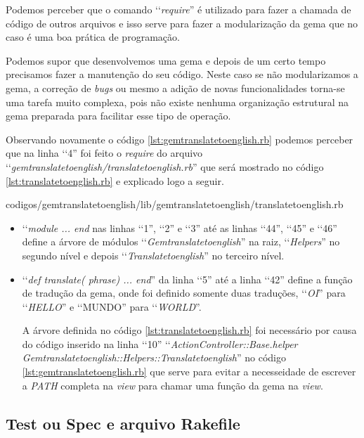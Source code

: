 Podemos perceber que o comando ‘‘\emph{require}'' é utilizado para fazer a chamada de código de outros 
arquivos e isso serve para fazer a modularização da gema que no caso é uma boa prática de programação.

Podemos supor que desenvolvemos uma gema e depois de um certo tempo precisamos fazer a manutenção do 
seu código. Neste caso se não modularizamos a gema, a correção de \emph{bugs} ou mesmo a adição de 
novas funcionalidades torna-se uma tarefa muito complexa, pois não existe nenhuma organização 
estrutural na gema preparada para facilitar esse tipo de operação. 

Observando novamente o código \ref{lst:gemtranslatetoenglish.rb} podemos perceber que na linha ‘‘4''
foi feito o \emph{require} do arquivo ‘‘\emph{gemtranslatetoenglish/translatetoenglish.rb}'' que
será mostrado no código \ref{lst:translatetoenglish.rb} e explicado logo a seguir.


{codigos/gemtranslatetoenglish/lib/gemtranslatetoenglish/translatetoenglish.rb}

\begin{itemize}

  \item ‘‘\emph{module ... end} nas linhas ‘‘1'', ‘‘2'' e ‘‘3'' até as linhas ‘‘44'', ‘‘45'' e ‘‘46'' 
  define a árvore de módulos ‘‘\emph{Gemtranslatetoenglish}'' na raiz, ‘‘\emph{Helpers}'' no segundo 
  nível e depois ‘‘\emph{Translatetoenglish}'' no terceiro nível.
  \item ‘‘\emph{def translate( phrase) ... end}'' da linha ‘‘5'' até a linha ‘‘42'' define a função de 
  tradução da gema, onde foi definido somente duas traduções, ‘‘\emph{OI}'' para ‘‘\emph{HELLO}'' 
  e ‘‘MUNDO'' para ‘‘\emph{WORLD}''.
  
  A árvore definida no código \ref{lst:translatetoenglish.rb} foi necessário por causa do código
  inserido na linha ‘‘10'' ‘‘\emph{ActionController::Base.helper Gemtranslatetoenglish::Helpers::Translatetoenglish}''
  no código \ref{lst:gemtranslatetoenglish.rb} que serve para evitar a necesseidade de escrever a
  \emph{PATH} completa na \emph{view} para chamar uma função da gema na \emph{view}.
  
\end{itemize}

\subsection{Test ou Spec e arquivo Rakefile}
\label{subsection:test_ou_spec_e_arquivo_rakefile}

